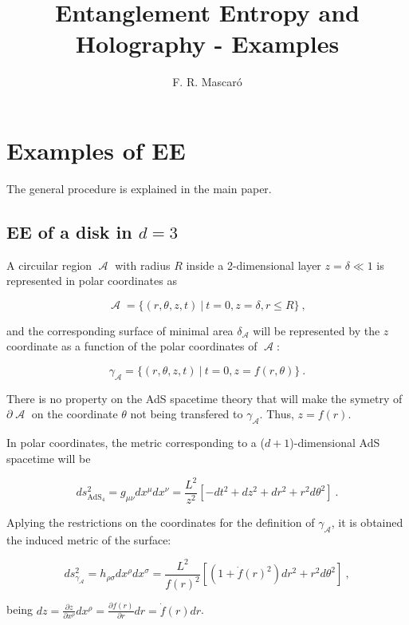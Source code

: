 \documentclass[lettersize,journal]{IEEEtran}
\title{Entanglement Entropy and Holography - Examples}
\author{F. R. Mascaró}
\date{}
\providecommand{\eq}[2]{
    \begin{equation}
        #2
    \label{eq:#1}
    \end{equation}
}
\DeclareMathOperator{\calA}{\mathcal{A}}
\begin{document}
\maketitle{}




\section{Examples of EE}

The general procedure is explained in the main paper.


\subsection{EE of a disk in $d=3$}

A circuilar region $\calA$ with radius $R$ inside a 2-dimensional layer $z = \delta \ll 1$ is represented in polar coordinates as
\eq{1A}{
    \calA = \{ ( r, \theta, z, t ) \ | \ t = 0, z = \delta, r \le R \} \ ,
}
and the corresponding surface of minimal area $\delta_{\calA}$ will be represented by the $z$ coordinate as a function of the polar coordinates of $\calA$:
\eq{1gammaA}{
    \gamma_{\calA} = \{ ( r, \theta, z, t ) \ | \ t = 0, z = f (r, \theta) \} \ .
}
There is no property on the AdS spacetime theory that will make the symetry of $\partial \calA$ on the coordinate $\theta$ not being transfered to $\gamma_{\calA}$. Thus, $z = f (r)$.

In polar coordinates, the metric corresponding to a ($d+1$)-dimensional AdS spacetime will be
\eq{1Ametric}{
    ds^2_{\text{AdS}_4} = g_{\mu \nu} dx^\mu dx^\nu = 
    \frac{L^2}{z^2} [ -dt^2 + dz^2 + dr^2 + r^2 d\theta^2 ] \ .
}

Aplying the restrictions on the coordinates for the definition of $\gamma_{\calA}$, it is obtained the induced metric of the surface:
\eq{1gammaAmetric}{
    ds^2_{\gamma_{\calA}} = h_{\rho \sigma} dx^\rho dx^\sigma = 
    \frac{L^2}{f(r)^2} \left[ \left( 1+ \dot{f}(r)^2 \right) dr^2 + r^2 d\theta^2 \right] \ ,
}
being $dz = \frac{\partial z}{\partial x^\rho} dx^\rho = \frac{\partial f(r)}{\partial r} dr = \dot{f}(r) dr$.
\end{document}

